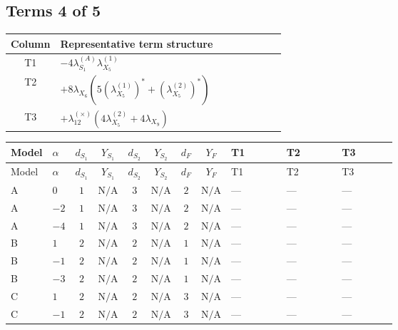 \documentclass[8pt]{article}
\begin{document}
\begin{landscape}
\subsection*{Terms 4 of 5}
\begin{center}
\begin{tabular}{@{}c >{\raggedright\arraybackslash}p{0.82\linewidth}@{}}
\toprule
Column & Representative term structure \\
\midrule
T1 & \(\displaystyle -4 {\lambda_{S_1}^{(A)}} {\lambda_{X_{5}}^{(1)}}\) \\
\midrule
T2 & \(\displaystyle +8 {\lambda_{X_{6}}} (5 \left({\lambda_{X_{5}}^{(1)}}\right)^{*}+\left({\lambda_{X_{5}}^{(2)}}\right)^{*})\) \\
\midrule
T3 & \(\displaystyle +{\lambda_{12}^{(\times)}} (4 {\lambda_{X_{5}}^{(2)}}+4 {\lambda_{X_{9}}})\) \\
\midrule
\bottomrule
\end{tabular}
\end{center}
\smallskip
\tiny
\begin{longtable}{@{}llcccccc >{\raggedright\arraybackslash}p{0.21\linewidth} >{\raggedright\arraybackslash}p{0.21\linewidth} >{\raggedright\arraybackslash}p{0.21\linewidth}@{}}
\toprule
Model & $\alpha$ & $d_{S_1}$ & $Y_{S_1}$ & $d_{S_2}$ & $Y_{S_2}$ & $d_F$ & $Y_F$ & T1 & T2 & T3 \\
\midrule
\endfirsthead
\toprule
Model & $\alpha$ & $d_{S_1}$ & $Y_{S_1}$ & $d_{S_2}$ & $Y_{S_2}$ & $d_F$ & $Y_F$ & T1 & T2 & T3 \\
\midrule
\endhead
A & $0$ & $1$ & $\text{N/A}$ & $3$ & $\text{N/A}$ & $2$ & $\text{N/A}$ & --- & --- & --- \\
\midrule
A & $-2$ & $1$ & $\text{N/A}$ & $3$ & $\text{N/A}$ & $2$ & $\text{N/A}$ & --- & --- & --- \\
\midrule
A & $-4$ & $1$ & $\text{N/A}$ & $3$ & $\text{N/A}$ & $2$ & $\text{N/A}$ & --- & --- & --- \\
\midrule
B & $1$ & $2$ & $\text{N/A}$ & $2$ & $\text{N/A}$ & $1$ & $\text{N/A}$ & --- & --- & --- \\
\midrule
B & $-1$ & $2$ & $\text{N/A}$ & $2$ & $\text{N/A}$ & $1$ & $\text{N/A}$ & --- & --- & --- \\
\midrule
B & $-3$ & $2$ & $\text{N/A}$ & $2$ & $\text{N/A}$ & $1$ & $\text{N/A}$ & --- & --- & --- \\
\midrule
C & $1$ & $2$ & $\text{N/A}$ & $2$ & $\text{N/A}$ & $3$ & $\text{N/A}$ & --- & --- & --- \\
\midrule
C & $-1$ & $2$ & $\text{N/A}$ & $2$ & $\text{N/A}$ & $3$ & $\text{N/A}$ & --- & --- & --- \\

\end{longtable}
\end{landscape}
\end{document}
